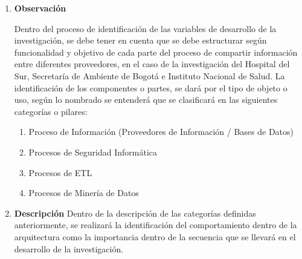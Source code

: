 \documentclass[a4paper, 12pt, oneside]{article}
\theoremstyle{definition}
\theoremstyle{remark}
\begin{document}
\begin{enumerate}[I]
\item\textbf{Observación}

Dentro del proceso de identificación de las variables de desarrollo de la investigación, se debe tener en cuenta que se debe estructurar según funcionalidad y objetivo de cada parte del  proceso de compartir información entre diferentes proveedores, en el caso de la investigación del Hospital del Sur, Secretaría de Ambiente de Bogotá e Instituto Nacional de Salud. La identificación de los componentes o partes, se dará por el tipo de objeto o uso, según lo nombrado se entenderá que se clasificará en las siguientes categorías o pilares:

\begin{enumerate}[1.]
\item{Proceso de Información (Proveedores de Información / Bases de Datos)}
\item{Procesos de Seguridad Informática}
\item{Procesos de ETL}
\item{Procesos de Minería de Datos}
\end{enumerate}

\item\textbf{Descripción}
Dentro de la descripción de las categorías definidas anteriormente, se realizará la identificación del comportamiento dentro de la arquitectura como la importancia dentro de la secuencia que se llevará en el desarrollo de la investigación.


\end{enumerate}
\end{document}
